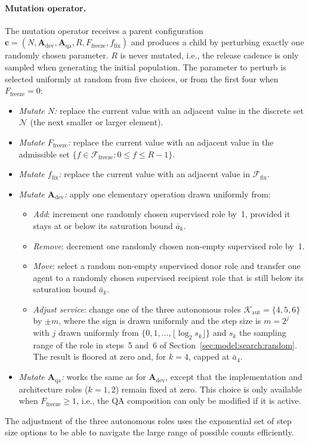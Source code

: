 \documentclass[smallextended]{svjour3}       %
\begin{document}
\paragraph{Mutation operator.}
The mutation operator receives a parent configuration
$\mathbf{c} = (N, \mathbf{A}_\mathrm{dev}, \mathbf{A}_\mathrm{qa}, R, F_\mathrm{freeze}, f_\mathrm{fix})$
and produces a child by perturbing exactly one randomly chosen parameter.
$R$ is never mutated, i.e., the release cadence is only sampled when generating the initial population.
The parameter to perturb is selected uniformly at random from five choices, or from the
first four when $F_\mathrm{freeze} = 0$:
\begin{itemize}
  \item \emph{Mutate $N$:} replace the current value with an adjacent value in the
        discrete set $\mathcal{N}$ (the next smaller or larger element).
  \item \emph{Mutate $F_\mathrm{freeze}$:} replace the current value with an adjacent value in
        the admissible set $\{f \in \mathcal{F}_\mathrm{freeze} : 0 \leq f \leq R-1\}$.
  \item \emph{Mutate $f_\mathrm{fix}$:} replace the current value with an adjacent value in
        $\mathcal{F}_\mathrm{fix}$.
  \item \emph{Mutate $\mathbf{A}_\mathrm{dev}$:} apply one elementary operation drawn uniformly from:
        \begin{itemize}
          \item \emph{Add}: increment one randomly chosen supervised role by~1, provided it
                stays at or below its saturation bound $\bar{a}_k$.
          \item \emph{Remove}: decrement one randomly chosen non-empty supervised role by~1.
          \item \emph{Move}: select a random non-empty supervised donor role and transfer one agent to a randomly chosen
                supervised recipient role that is still below its saturation bound $\bar{a}_k$.
          \item \emph{Adjust service}: change one of the three autonomous roles
                $\mathcal{K}_\mathrm{aut} = \{4,5,6\}$ by $\pm m$, where the sign is drawn uniformly
                and the step size is $m = 2^j$ with $j$ drawn uniformly from
                $\{0, 1, \ldots, \lfloor \log_2 s_k \rfloor\}$ and $s_k$ the sampling range of the
                role in steps~5 and~6 of Section~\ref{sec:model:search:random}. The result is floored at zero and, for $k=4$, capped at $\bar{a}_4$. 
        \end{itemize}
  \item \emph{Mutate $\mathbf{A}_\mathrm{qa}$:} works the same as for $\mathbf{A}_\mathrm{dev}$, except that the implementation and architecture roles ($k = 1, 2$) remain fixed at zero. This choice is only available when $F_\mathrm{freeze} \geq 1$, i.e., the QA composition can only be modified if it is active.
\end{itemize}
The adjustment of the three autonomous roles uses the exponential set of step size options to be able to navigate the large range of possible counts efficiently. 
\end{document}
